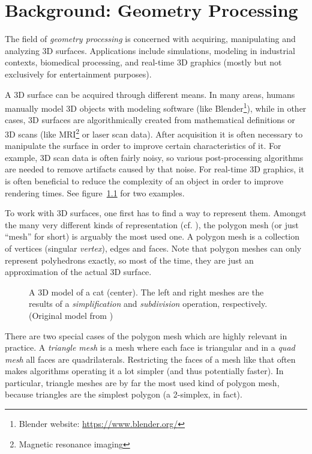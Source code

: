 \newlength{\origtabcolsep}
\setlength{\origtabcolsep}{\tabcolsep}


\chapter{Background: Geometry Processing}

The field of \emph{geometry processing} is concerned with acquiring, manipulating and analyzing 3D surfaces.
Applications include simulations, modeling in industrial contexts, biomedical processing, and real-time 3D graphics (mostly but not exclusively for entertainment purposes).

A 3D surface can be acquired through different means.
In many areas, humans manually model 3D objects with modeling software (like Blender\footnote{Blender website: \url{https://www.blender.org/}}), while in other cases, 3D surfaces are algorithmically created from mathematical definitions or 3D scans (like MRI\footnote{Magnetic resonance imaging} or laser scan data).
After acquisition it is often necessary to manipulate the surface in order to improve certain characteristics of it.
For example, 3D scan data is often fairly noisy, so various post-processing algorithms are needed to remove artifacts caused by that noise.
For real-time 3D graphics, it is often beneficial to reduce the complexity of an object in order to improve rendering times.
See figure~\ref{fig:cat-algo} for two examples.

To work with 3D surfaces, one first has to find a way to represent them.
Amongst the many very different kinds of representation (cf. \cite[Chapter~1]{botsch2010polygon}), the polygon mesh (or just \enquote{mesh} for short) is arguably the most used one.
A polygon mesh is a collection of vertices (singular \emph{vertex}), edges and faces.
Note that polygon meshes can only represent polyhedrons exactly, so most of the time, they are just an approximation of the actual 3D surface.

\begin{figure}[b]
  
  \caption{A 3D model of a cat (center).
  The left and right meshes are the results of a \emph{simplification} and \emph{subdivision} operation, respectively.
  (Original model from \cite{catmodel})}
  \label{fig:cat-algo}
\end{figure}

There are two special cases of the polygon mesh which are highly relevant in practice.
A \emph{triangle mesh} is a mesh where each face is triangular and in a \emph{quad mesh} all faces are quadrilaterals.
Restricting the faces of a mesh like that often makes algorithms operating it a lot simpler (and thus potentially faster).
In particular, triangle meshes are by far the most used kind of polygon mesh, because triangles are the simplest polygon (a 2-simplex, in fact).

